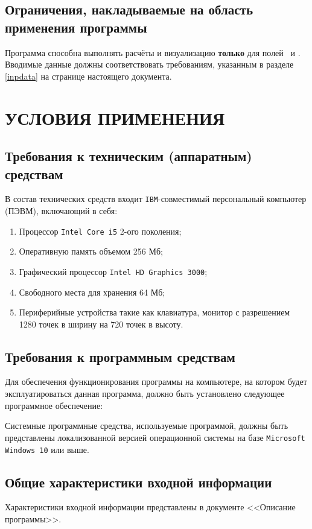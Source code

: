 \documentclass[14pt,a4paper,final]{extreport}
\begin{document}
\section{Ограничения, накладываемые на область применения программы}
Программа способна выполнять расчёты и визуализацию \textbf{только} для полей
\fieldA\ и \fieldB. Вводимые данные должны соответствовать требованиям,
указанным в разделе \ref{inpdata} на странице \pageref{inpdata} настоящего документа.

\chapter{УСЛОВИЯ ПРИМЕНЕНИЯ}
\section{Требования к техническим (аппаратным) средствам}
В состав технических средств входит \texttt{IBM}-совместимый персональный компьютер
(ПЭВМ), включающий в себя:
\begin{enumerate}[label=\asbuk*),ref=\asbuk*]
	\item Процессор \texttt{Intel Core i5} 2-ого поколения;
	\item Оперативную память объемом 256 Мб;
	\item Графический процессор \texttt{Intel HD Graphics 3000};
	\item Свободного места для хранения 64 Мб;
	\item Периферийные устройства такие как клавиатура, монитор с разрешением 1280 точек в ширину на 720 точек в высоту.
\end{enumerate}

\section{Требования к программным средствам}
Для обеспечения функционирования программы на компьютере, на котором будет эксплуатироваться данная программа, должно быть установлено следующее программное обеспечение:

Системные программные средства, используемые программой, должны быть представлены локализованной версией операционной системы на базе
\texttt{Microsoft Windows 10} или выше.

\section{Общие характеристики входной информации}
Характеристики входной информации представлены в документе <<Описание программы>>.
\end{document}
